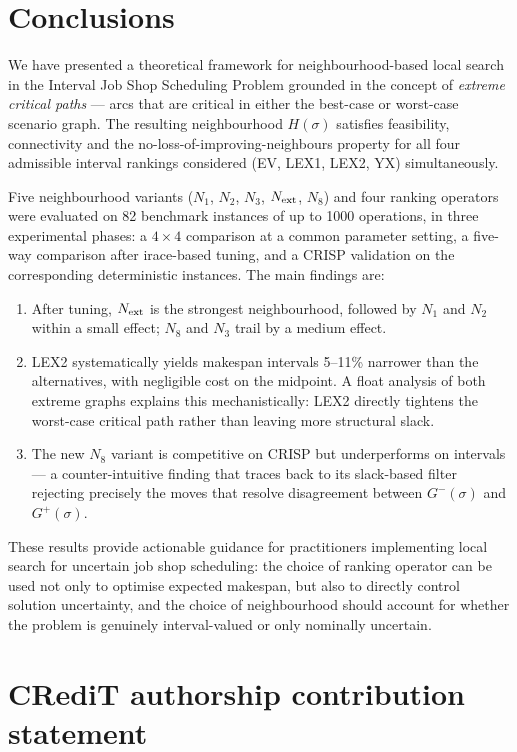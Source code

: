 \documentclass[preprint,12pt]{elsarticle}
\begin{document}
\section{Conclusions}
\label{sec8}

We have presented a theoretical framework for neighbourhood-based local search in the Interval Job Shop Scheduling Problem grounded in the concept of \emph{extreme critical paths} --- arcs that are critical in either the best-case or worst-case scenario graph. The resulting neighbourhood $H(\sigma)$ satisfies feasibility, connectivity and the no-loss-of-improving-neighbours property for all four admissible interval rankings considered (EV, LEX1, LEX2, YX) simultaneously.

Five neighbourhood variants ($N_1$, $N_2$, $N_3$, $N_{\rm ext}$, $N_8$) and four ranking operators were evaluated on 82 benchmark instances of up to 1000 operations, in three experimental phases: a $4 \times 4$ comparison at a common parameter setting, a five-way comparison after irace-based tuning, and a CRISP validation on the corresponding deterministic instances. The main findings are:
\begin{enumerate}
\item After tuning, $N_{\rm ext}$ is the strongest neighbourhood, followed by $N_1$ and $N_2$ within a small effect; $N_8$ and $N_3$ trail by a medium effect.
\item LEX2 systematically yields makespan intervals 5--11\% narrower than the alternatives, with negligible cost on the midpoint. A float analysis of both extreme graphs explains this mechanistically: LEX2 directly tightens the worst-case critical path rather than leaving more structural slack.
\item The new $N_8$ variant is competitive on CRISP but underperforms on intervals --- a counter-intuitive finding that traces back to its slack-based filter rejecting precisely the moves that resolve disagreement between $G^-(\sigma)$ and $G^+(\sigma)$.
\end{enumerate}
These results provide actionable guidance for practitioners implementing local search for uncertain job shop scheduling: the choice of ranking operator can be used not only to optimise expected makespan, but also to directly control solution uncertainty, and the choice of neighbourhood should account for whether the problem is genuinely interval-valued or only nominally uncertain.


\section*{CRediT authorship contribution statement}
\end{document}
